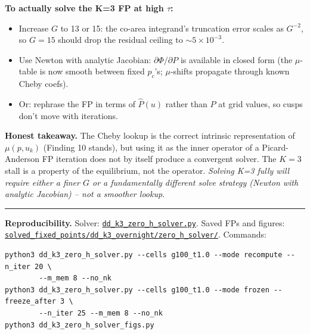 \documentclass[10pt,a4paper]{article}
\begin{document}
\textbf{To actually solve the K{=}3 FP at high $\tau$:}
\begin{itemize}\setlength{\itemsep}{0pt}
\item Increase $G$ to 13 or 15: the co-area integrand's truncation error
  scales as $G^{-2}$, so $G{=}15$ should drop the residual ceiling to
  $\sim\!5\!\times\!10^{-3}$.
\item Use Newton with analytic Jacobian: $\partial\Phi/\partial P$ is
  available in closed form (the $\mu$-table is now smooth between fixed
  $p_c$'s; $\mu$-shifts propagate through known Cheby coefs).
\item Or: rephrase the FP in terms of $\hat P(u)$ rather than $P$ at grid
  values, so cusps don't move with iterations.
\end{itemize}

\textbf{Honest takeaway.} The Cheby lookup is the correct intrinsic
representation of $\mu(p,u_k)$ (Finding 10 stands), but using it as the
inner operator of a Picard-Anderson FP iteration does not by itself produce
a convergent solver. The $K{=}3$ stall is a property of the equilibrium,
not the operator. \emph{Solving K{=}3 fully will require either a finer
$G$ or a fundamentally different solve strategy (Newton with analytic
Jacobian) -- not a smoother lookup.}

\bigskip
\hrule
\smallskip

\noindent\footnotesize
\textbf{Reproducibility.} Solver:
\href{file:/home/user/FIXED-POINT-FACTORY/projects/REZN/solver_code/highprec_dd_qd/dd_k3_zero_h_solver.py}%
{\texttt{dd\_k3\_zero\_h\_solver.py}}.
Saved FPs and figures:
\href{file:/home/user/FIXED-POINT-FACTORY/projects/REZN/solved_fixed_points/dd_k3_overnight/zero_h_solver/}%
{\texttt{solved\_fixed\_points/dd\_k3\_overnight/zero\_h\_solver/}}.
Commands:
\begin{verbatim}
python3 dd_k3_zero_h_solver.py --cells g100_t1.0 --mode recompute --n_iter 20 \
        --m_mem 8 --no_nk
python3 dd_k3_zero_h_solver.py --cells g100_t1.0 --mode frozen --freeze_after 3 \
        --n_iter 25 --m_mem 8 --no_nk
python3 dd_k3_zero_h_solver_figs.py
\end{verbatim}
\end{document}
